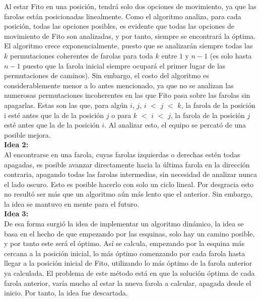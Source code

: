 \documentclass[10pt,letterpaper]{article}
\begin{document}
{ 	Al estar Fito en una posici\'on, tendr\'a solo dos opciones de movimiento, ya que las farolas est\'an posicionadas linealmente. Como el algoritmo analiza, para cada posici\'on, todas las opciones posibles, es evidente que todas las opciones de movimiento de Fito son analizadas, y por tanto, siempre se encontrar\'a la \'optima. El algoritmo crece exponencialmente, puesto que se analizar\'an siempre todas las $k$ permutaciones coherentes de farolas para toda $k$ entre $1$ y $n - 1$ (es solo hasta $n - 1$ puesto que la farola inicial siempre ocupar\'a el primer lugar de las permutaciones de caminos). Sin embargo, el costo del algoritmo es considerablemente menor a lo antes mencionado, ya que no se analizan las numerosas permutaciones incoherentes en las que Fito pasa sobre las farolas sin apagarlas. Estas son las que, para alg\'un $i$, $j$,  $i$ $<$ $j$ $<$ $k$, la farola de la posici\'on i est\'e antes que la de la posici\'on $j$ o para $k$ $<$ $i$ $<$ $j$, la farola de la posici\'on $j$ est\'e antes que la de la posici\'on $i$. Al analizar esto, el equipo se percat\'o de una posible mejora.\\
 	
 	
 	{\Large \bf Idea 2:}\\
 	
 	Al encontrarse en una farola, cuyas farolas izquierdas o derechas est\'en todas apagadas, es posible avanzar directamente hacia la \'ultima farola en la direcci\'on contraria, apagando todas las farolas intermedias, sin necesidad de analizar nunca el lado oscuro. Esto es posible hacerlo con solo un ciclo lineal. Por desgracia esto no result\'o ser m\'as que un algoritmo a\'un m\'as lento que el anterior. Sin embargo, la idea se mantuvo en mente para el futuro.\\
 	
 	{\Large \bf Idea 3:}\\
 	
 	De esa forma surgi\'o la idea de implementar un algoritmo din\'amico, la idea se basa en el hecho de que empezando por las esquinas, solo hay un camino posible, y por tanto este ser\'a el \'optimo. As\'i se calcula, empezando por la esquina m\'as cercana a la posici\'on inicial, lo m\'as \'optimo comenzando por cada farola hasta llegar a la posici\'on inicial de Fito, utilizando lo m\'as \'optimo de la farola anterior ya calculada. El problema de este m\'etodo est\'a en que la soluci\'on \'optima de cada farola anterior, var\'ia mucho al estar la nueva farola a calcular, apagada desde el inicio. Por tanto, la idea fue descartada.\\
 	
}
\end{document}
